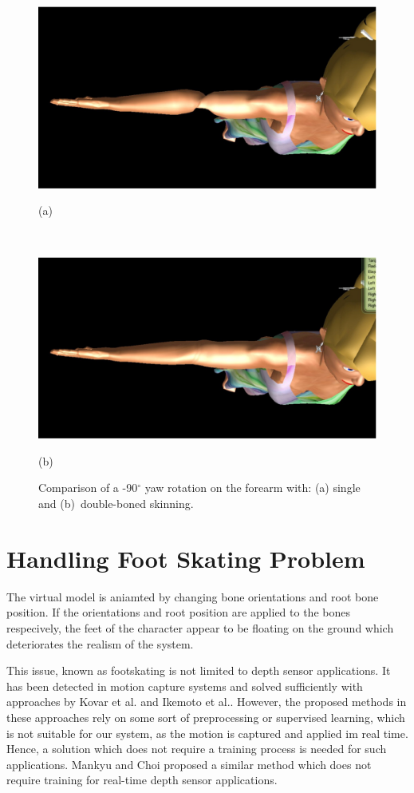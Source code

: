 \begin{figure}[htbp]
	\centerline{\includegraphics[width=1.0\columnwidth]{./figures/fore-arm-single-bone.eps}}
	\centerline{(a)}
	\centerline{\ }
	\centerline{\includegraphics[width=1.0\columnwidth]{./figures/fore-arm-double-bone.eps}}
	\centerline{(b)}
	\caption{Comparison of a -90$^\circ$ yaw rotation on the forearm with: (a) single and (b)~double-boned skinning.}
	\label{fig:forearm-comparison}
\end{figure}

\section{Handling Foot Skating Problem}
\label{section_foot_skating}
The virtual model is aniamted by changing bone orientations and root bone position. If the orientations and root position are applied to 
the bones respecively, the feet of the character appear to be floating on the ground which deteriorates the realism of the system. 

This issue, known as footskating is not limited to depth sensor applications. It has been detected in motion capture systems and solved sufficiently with approaches by 
Kovar et al.\cite{Kovar2002} and Ikemoto et al.\cite{Ikemoto2006}. However, the proposed methods in these approaches rely on some sort of preprocessing or supervised learning,
which is not suitable for our system, as the motion is captured and applied im real time. Hence, a solution which does not require a training process is needed for such applications. 
Mankyu and Choi \cite{Mankyu2013} proposed a similar method which does not require training for real-time depth sensor applications. 

